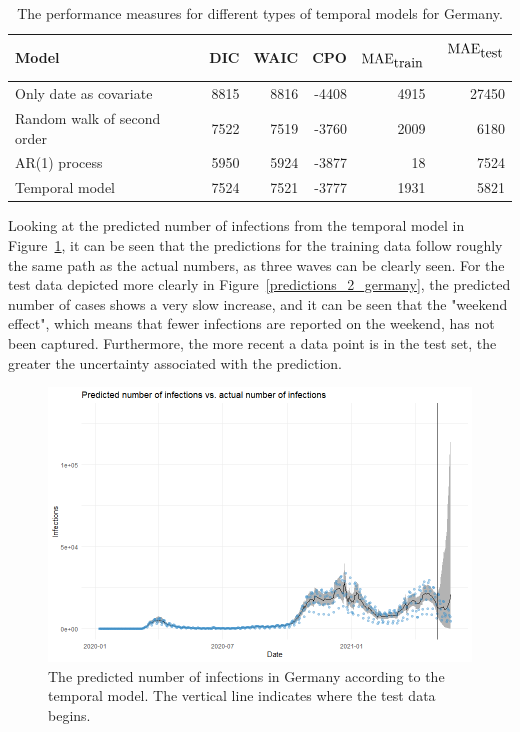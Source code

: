 \begin{table}[H] 
\caption{The performance measures for different types of temporal models for Germany. \label{germany_temporal}}
\begin{tabular}{l r r r r r}
\toprule
\textbf{Model}	& \textbf{DIC}	& \textbf{WAIC} & \textbf{CPO} & \textbf{$\hbox{MAE}_{\hbox{train}}$} & \textbf{$\hbox{MAE}_{\hbox{test}}$}\ \\
\midrule
Only date as covariate & 8815 & 8816 & -4408 & 4915 & 27450 \\
Random walk of second order & 7522 & 7519 & -3760 & 2009 & 6180 \\
AR(1) process & 5950 & 5924 & -3877 & 18 & 7524 \\
Temporal model &  7524 & 7521 & -3777 & 1931 & 5821 \\
\bottomrule
\end{tabular}
\end{table}
Looking at the predicted number of infections from the temporal model in Figure~\ref{predictions_1_germany}, it can be seen that the predictions for the training data follow roughly the same path as the actual numbers, as three waves can be clearly seen. For the test data depicted more clearly in Figure~\ref{predictions_2_germany}, the predicted number of cases shows a very slow increase, and it can be seen that the "weekend effect", which means that fewer infections are reported on the weekend, has not been captured. Furthermore, the more recent a data point is in the test set, the greater the uncertainty associated with the prediction.
\begin{figure}[H]
  \centering
  \includegraphics[width = \textwidth]{predictions_1_germany.png}
  \caption{The predicted number of infections in Germany according to the temporal model. The vertical line indicates where the test data begins.}
  \label{predictions_1_germany}
\end{figure}
